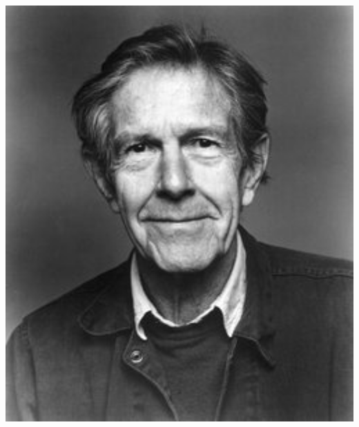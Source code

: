 \documentclass[17pt]{extarticle}
\begin{document}
{{\begin{center}
  \includegraphics[height=7in]{images/john-cage-portrait.jpg}
\end{center}


}}
\end{document}
